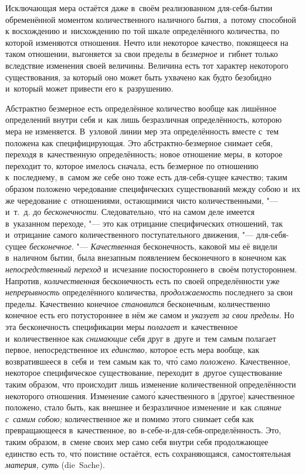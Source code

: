 
Исключающая мера остаётся даже в~своём реализованном для-себя-бытии
обременённой моментом количественного наличного бытия, а~потому способной к
восхождению и~нисхождению по той шкале определённого количества, по которой
изменяются отношения. Нечто или некоторое качество, покоящееся на таком
отношении, выгоняется за свои пределы в {\em безмерное} и~гибнет только
вследствие изменения своей величины. Величина есть тот характер некоторого
существования, за который оно может быть ухвачено как будто безобидно и~который
может привести его к~разрушению.

Абстрактно безмерное есть определённое количество вообще как лишённое
определений внутри себя и~как лишь безразличная определённость, которою мера не
изменяется. В~узловой линии мер эта определённость вместе с~тем положена как
специфицирующая. Это абстрактно-безмерное снимает себя, переходя в~качественную
определённость; новое отношение меры, в~которое переходит то, которое имелось
сначала, есть безмерное по отношению к~последнему, в~самом же себе оно тоже
есть для-себя-сущее качество; таким образом положено чередование специфических
существований между собою и~их же чередование с~отношениями, остающимися чисто
количественными, "--- и~т.~д. до {\em бесконечности}. Следовательно, чт\'{о} на
самом деле имеется в~указанном переходе, "--- это как отрицание специфических
отношений, так и~отрицание самого количественного поступательного движения,
"--- для-себя-сущее {\em бесконечное}. "--- {\em Качественная} бесконечность,
каковой мы её видели в~наличном бытии, была внезапным появлением бесконечного в
конечном как {\em непосредственный переход} и~исчезание посюстороннего в~своём
потустороннем. Напротив, {\em количественная} бесконечность есть по своей
определённости уже {\em непрерывность} определённого количества,
{\em продолжаемость} последнего за свои пределы. Качественно конечное
{\em становится} бесконечным, количественно конечное есть его потустороннее в
нём же самом и {\em указует за свои пределы}. Но эта бесконечность спецификации
меры {\em полагает} и~качественное и~количественное как {\em снимающие} себя
друг в~друге и~тем самым полагает первое, непосредственное их {\em единство,}
которое есть мера вообще, как возвратившееся в~себя и~тем самым как то, чт\'{о}
само {\em положено}. Качественное, некоторое специфическое существование,
переходит в~другое существование таким образом, что происходит лишь изменение
количественной определённости некоторого отношения. Изменение самог\'{о}
качественного в [другое] качественное положено, стало быть, как внешнее и
безразличное изменение и~как {\em слияние с~самим собою;} количественное же и
помимо этого снимает себя как превращающееся в~качественное,
во~в-себе-и-для-себя-определённость. Это, таким образом, в~смене своих мер само
себя внутри себя продолжающее единство есть то, чт\'{о} поистине остаётся, есть
сохраняющаяся, самостоятельная {\em материя, суть} (die~Sache).

